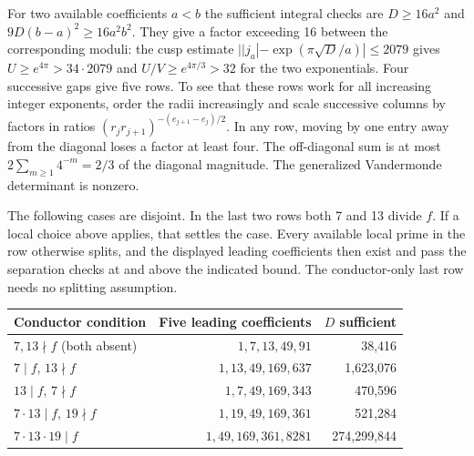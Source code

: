For two available coefficients $a<b$ the sufficient integral checks
are $D\ge16a^2$ and
$9D(b-a)^2\ge16a^2b^2$. They give a factor exceeding 16 between
the corresponding moduli: the cusp estimate
$||j_a|-\exp(\pi\sqrt D/a)|\le2079$ gives
$U\ge e^{4\pi}>34\cdot2079$ and $U/V\ge e^{4\pi/3}>32$ for the two
exponentials. Four successive gaps give five rows. To see that these rows work for all
increasing integer exponents, order the radii increasingly and scale
successive columns by factors in ratios
$(r_jr_{j+1})^{-(e_{j+1}-e_j)/2}$. In any row, moving by one entry
away from the diagonal loses a factor at least four. The off-diagonal
sum is at most $2\sum_{m\ge1}4^{-m}=2/3$ of the diagonal magnitude.
The generalized Vandermonde determinant is nonzero.

The following cases are disjoint. In the last two rows both 7 and 13
divide $f$. If a local choice above applies, that settles the case.
Every available local prime in the row otherwise splits, and the
displayed leading coefficients then exist and pass the separation
checks at and above the indicated bound. The conductor-only last row
needs no splitting assumption.
\begin{center}\small
\begin{tabular}{lrr}
\toprule
Conductor condition & Five leading coefficients & $D$ sufficient\\
\midrule
$7,13\nmid f$ (both absent) & $1,7,13,49,91$ & 38,416\\
$7\mid f$, $13\nmid f$ & $1,13,49,169,637$ & 1,623,076\\
$13\mid f$, $7\nmid f$ & $1,7,49,169,343$ & 470,596\\
$7\cdot13\mid f$, $19\nmid f$ & $1,19,49,169,361$ & 521,284\\
$7\cdot13\cdot19\mid f$ & $1,49,169,361,8281$ & 274,299,844\\
\bottomrule
\end{tabular}
\end{center}


